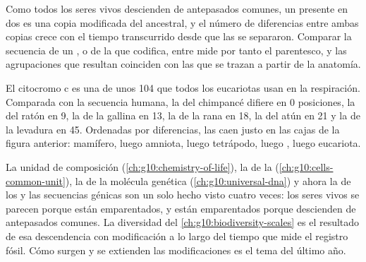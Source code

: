 \begin{proposition}\label{prop:g10:common-ancestry:molecular}
Como todos los seres vivos descienden de antepasados comunes, un 
presente en dos  es una copia modificada del  ancestral, y
el número de diferencias entre ambas copias crece con el tiempo
transcurrido desde que las  se separaron. Comparar la secuencia
de un , o de la  que codifica, entre  mide por tanto
el parentesco, y las agrupaciones que resultan coinciden con las que se
trazan a partir de la anatomía.
\end{proposition}
\admitted

\begin{example}[El citocromo c]\label{ex:g10:common-ancestry:cytochrome}
El citocromo c es una  de unos 104  que todos los
eucariotas usan en la respiración. Comparada con la secuencia humana,
la del chimpancé difiere en 0 posiciones, la del ratón en 9, la de la
gallina en 13, la de la rana en 18, la del atún en 21 y la de la
levadura en 45. Ordenadas por diferencias, las  caen justo en
las cajas de la figura anterior: mamífero, luego amniota, luego
tetrápodo, luego , luego eucariota.
\end{example}

\begin{remark}\label{rem:g10:common-ancestry:unity}
La unidad de composición (\cref{ch:g10:chemistry-of-life}), la de la
 (\cref{ch:g10:cells-common-unit}), la de la molécula genética
(\cref{ch:g10:universal-dna}) y ahora la de los 
y las secuencias génicas son un solo hecho visto cuatro veces: los
seres vivos se parecen porque están emparentados, y están emparentados
porque descienden de antepasados comunes. La diversidad del
\cref{ch:g10:biodiversity-scales} es el resultado de esa descendencia
con modificación a lo largo del tiempo que mide el registro fósil. Cómo
surgen y se extienden las modificaciones es el tema del último año.
\end{remark}

